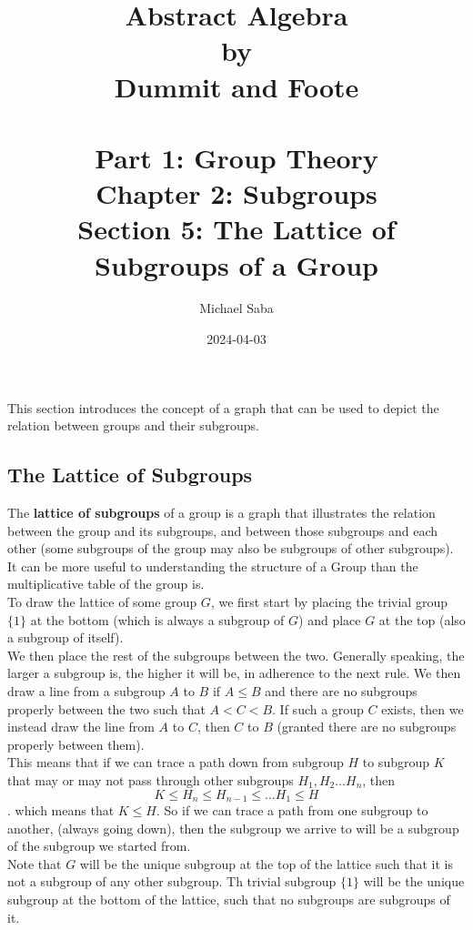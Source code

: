 \documentclass[12pt]{article}
\title{%
    \Huge Abstract Algebra \\
    \large by \\
    \Large Dummit and Foote \\~\\
    \huge Part 1: Group Theory \\
    \LARGE Chapter 2: Subgroups \\
    \Large Section 5: The Lattice of Subgroups of a Group
}
\date{2024-04-03}
\author{Michael Saba}
\begin{document}
    \maketitle
    \newpage

    
    This section introduces the concept of a graph 
    that can be used to depict the relation between groups
    and their subgroups. \\

    \subsection*{The Lattice of Subgroups}

    The \textbf{lattice of subgroups} of a group
    is a graph that illustrates the relation between
    the group and its subgroups,
    and between those subgroups and each other
    (some subgroups of the group may also be
    subgroups of other subgroups). \\
    It can be more useful to understanding the structure of a Group
    than the multiplicative table of the group is. \\
    To draw the lattice of some group $G$,
    we first start by placing the trivial group $\{1\}$
    at the bottom
    (which is always a subgroup of $G$)
    and place $G$ at the top
    (also a subgroup of itself). \\
    We then place the rest of the subgroups
    between the two.
    Generally speaking, the larger a subgroup is,
    the higher it will be, in adherence to the next rule.
    We then draw a line from a subgroup $A$ to $B$
    if $A \leqslant B$ and there are no subgroups
    properly between the two such that $A < C < B$.
    If such a group $C$ exists,
    then we instead draw the line from $A$ to $C$,
    then $C$ to $B$
    (granted there are no subgroups properly between them). \\
    This means that if we can trace a path down from subgroup $H$
    to subgroup $K$ that may or may not pass through
    other subgroups $H_1, H_2 \dots H_n$,
    then
    \[ K \leqslant H_n \leqslant H_{n-1} \leqslant \dots H_1 \leqslant H \].
    which means that $K \leqslant H$.
    So if we can trace a path from one subgroup to another,
    (always going down),
    then the subgroup we arrive to will be a subgroup
    of the subgroup we started from. \\
    Note that $G$ will be the unique subgroup at the top of the lattice
    such that it is not a subgroup of any other subgroup.
    Th trivial subgroup $\{1\}$ will be the unique
    subgroup at the bottom of the lattice,
    such that no subgroups are subgroups of it. \\
    
\end{document}
